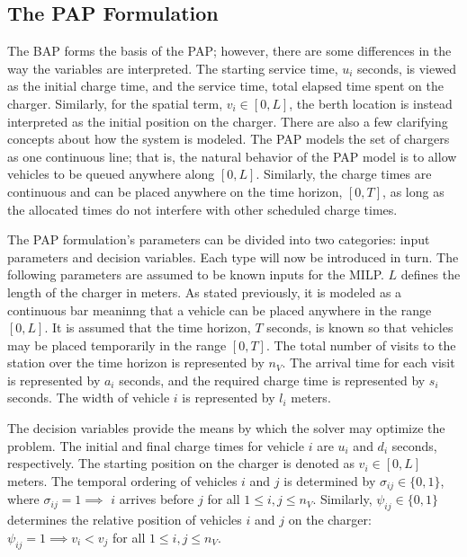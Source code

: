 \documentclass[utf8]{FrontiersinHarvard}
\begin{document}
\subsection{The PAP Formulation}
\label{sec:the-pap-formulation}
The BAP forms the basis of the PAP; however, there are some differences in the way the variables are interpreted. The
starting service time, \(u_i\) seconds, is viewed as the initial charge time, and the service time, total elapsed time
spent on the charger. Similarly, for the spatial term, \(v_i \in [0,L]\), the berth location is instead interpreted as the
initial position on the charger. There are also a few clarifying concepts about how the system is modeled. The PAP
models the set of chargers as one continuous line; that is, the natural behavior of the PAP model is to allow vehicles
to be queued anywhere along \([0,L]\). Similarly, the charge times are continuous and can be placed anywhere on the time
horizon, \([0,T]\), as long as the allocated times do not interfere with other scheduled charge times.

The PAP formulation's parameters can be divided into two categories: input parameters and decision variables. Each type
will now be introduced in turn. The following parameters are assumed to be known inputs for the MILP. \(L\) defines the
length of the charger in meters. As stated previously, it is modeled as a continuous bar meaninng that a vehicle can be
placed anywhere in the range \([0,L]\). It is assumed that the time horizon, \(T\) seconds, is known so that vehicles may be
placed temporarily in the range \([0,T]\). The total number of visits to the station over the time horizon is represented
by \(n_V\). The arrival time for each visit is represented by \(a_i\) seconds, and the required charge time is represented
by \(s_i\) seconds. The width of vehicle \(i\) is represented by \(l_i\) meters.

The decision variables provide the means by which the solver may optimize the problem. The initial and final charge
times for vehicle \(i\) are \(u_i\) and \(d_i\) seconds, respectively. The starting position on the charger is denoted as \(v_i
\in [0,L]\) meters. The temporal ordering of vehicles \(i\) and \(j\) is determined by \(\sigma_{ij} \in \{0, 1\}\), where \(\sigma_{ij} = 1
\implies\) \(i\) arrives before \(j\) for all \(1 \le i,j \le n_V\). Similarly, \(\psi_{ij} \in \{0, 1\}\) determines the relative
position of vehicles \(i\) and \(j\) on the charger: \(\psi_{ij} = 1 \implies v_i < v_j\) for all \(1 \le i,j \le n_V\).
\end{document}
